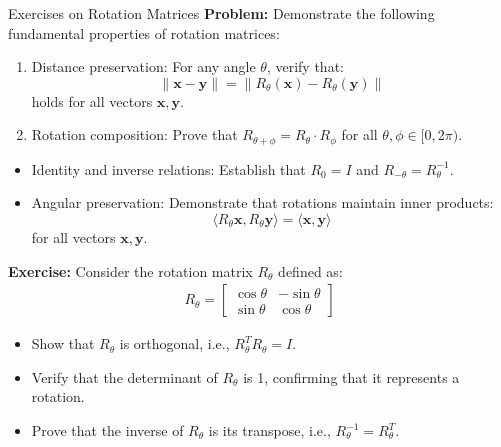 \begin{frame}{Exercises on Rotation Matrices}
    \textbf{Problem:} Demonstrate the following fundamental properties of rotation matrices:
    \begin{enumerate}
        \item Distance preservation: For any angle $\theta$, verify that:
        $$\|\mathbf{x} - \mathbf{y}\| = \|R_\theta(\mathbf{x}) - R_\theta(\mathbf{y})\|$$
        holds for all vectors $\mathbf{x}, \mathbf{y}$.
        
        \item Rotation composition: Prove that $R_{\theta + \phi} = R_{\theta} \cdot R_{\phi}$ for all $\theta, \phi \in [0, 2\pi)$.
    \end{enumerate}
\end{frame}

\begin{frame}
    \begin{itemize}
        \item Identity and inverse relations: Establish that $R_{0} = I$ and $R_{-\theta} = R_{\theta}^{-1}$.
        
        \item Angular preservation: Demonstrate that rotations maintain inner products:
        $$\langle R_\theta \mathbf{x}, R_\theta \mathbf{y} \rangle = \langle \mathbf{x}, \mathbf{y} \rangle$$
        for all vectors $\mathbf{x}, \mathbf{y}$.
    \end{itemize}
\end{frame}

\begin{frame}
    \textbf{Exercise:} Consider the rotation matrix $R_\theta$ defined as:
    \begin{align}
        R_\theta = \begin{bmatrix}
            \cos \theta & -\sin \theta \\
            \sin \theta & \cos \theta
        \end{bmatrix}
    \end{align}
    \begin{itemize}
        \item Show that $R_\theta$ is orthogonal, i.e., $R_\theta^T R_\theta = I$.
        \item Verify that the determinant of $R_\theta$ is 1, confirming that it represents a rotation.
        \item Prove that the inverse of $R_\theta$ is its transpose, i.e., $R_\theta^{-1} = R_\theta^T$.
    \end{itemize}
\end{frame}

